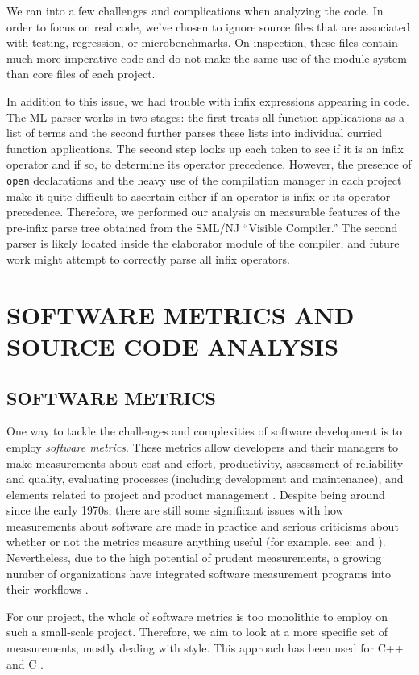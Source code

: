 \documentclass[12pt,abstracton]{scrartcl}
\begin{document}
We ran into a few challenges and complications when analyzing the code.
In order to focus on real code, we've chosen to ignore source files that are associated
with testing, regression, or microbenchmarks. On inspection, these files contain much more imperative
code and do not make the same use of the module system than core files of each project.

In addition to this issue, we had trouble with infix expressions appearing in code.
The ML parser works in two stages: the first treats all function applications
as a list of terms and the second further parses these lists into individual
curried function applications. The second step looks up each token to
see if it is an infix operator and if so, to determine its
operator precedence. However,
the presence of \texttt{open} declarations and the
heavy use of the compilation manager in each project
make it quite difficult to ascertain either if an
operator is infix or its operator precedence.
Therefore, we performed our analysis on measurable features
of the pre-infix parse tree obtained from the SML/NJ ``Visible Compiler.''
The second parser is likely located inside the elaborator module
of the compiler, and future work might attempt to
correctly parse all infix operators.
\section{SOFTWARE METRICS AND SOURCE CODE ANALYSIS}\label{sec:metric}
\subsection{SOFTWARE METRICS}
One way to tackle the challenges and complexities of software development is to employ
\emph{software metrics}. These metrics allow developers and their managers to make
measurements about cost and effort, productivity, assessment of reliability and
quality, evaluating processes (including development and maintenance), and elements
related to project and product management \cite{Ord08}. Despite being around since
the early 1970s, there are still some significant issues with how measurements
about software are made in practice and serious criticisms about whether or not the metrics
measure anything useful (for example, see: \cite{Jon94} and \cite{Bou12}).
Nevertheless, due to the high potential of prudent measurements,
a growing number of organizations have integrated software measurement programs into
their workflows \cite{Ord08}.

For our project, the whole of software metrics is too monolithic to employ on
such a small-scale project. Therefore, we aim to look at a more specific set of measurements,
mostly dealing with style. This approach has been used for C++ \cite{Aye98} and C \cite{Tak11}.
\end{document}
